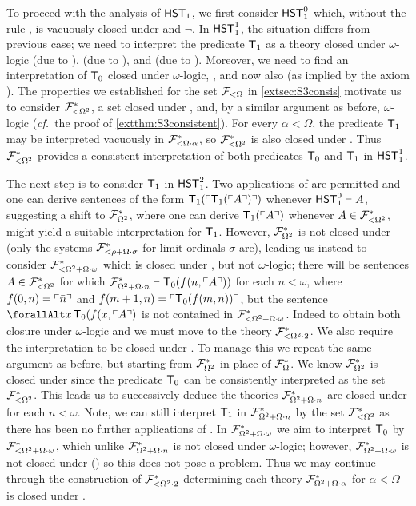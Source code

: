 \documentclass[UKenglish,cleveref,DIV=12]{scrartcl}
\let\forall\forallAlt
\theoremstyle{definition}
\theoremstyle{definition}
\begin{document}
To proceed with the analysis of $\mathsf{HST}_1$, we first consider $\mathsf{HST}_1^0$ which, without
the rule , is vacuously closed
under  and $\lnot$. In $\mathsf{HST}_1^1$, the situation differs
from previous case; we need to interpret the predicate $\mathsf{T}_1$ as a theory closed
under $\omega$-logic (due to ),  (due to ),
 and  (due to ). Moreover, we need to find an interpretation of $\mathsf{T}_0$ closed under $\omega$-logic, , and now also  (as
implied by the axiom ). The properties we established for the set
$\mathcal{F}_{<\Omega}$
in \cref{extsec:S3consis} motivate us to consider $\mathcal{F}^*_{<\Omega^2}$, a set
closed under ,  and, by a
similar argument as before, $\omega$-logic ({{\em cf.}~the proof of
\cref{extthm:S3consistent}}). For every $\alpha<\Omega$, the predicate
$\mathsf{T}_1$ may be interpreted vacuously in $\mathcal{F}^*_{<\Omega\cdot\alpha}$, so
$\mathcal{F}^*_{<\Omega^2}$ is also closed under . Thus $\mathcal{F}^*_{<\Omega^2}$
provides a consistent interpretation of both predicates $\mathsf{T}_0$ and $\mathsf{T}_1$ in
$\mathsf{HST}_1^1$.

The next step is to consider $\mathsf{T}_1$ in $\mathsf{HST}_1^2$. Two applications of
 are permitted and one can derive sentences of the form $\mathsf{T}_1(\ulcorner{\mathsf{T}_1(\ulcorner{A}\urcorner)}\urcorner)$
whenever $\mathsf{HST}_1^0\vdash A$,  suggesting a
shift to $\mathcal{F}^*_{\Omega^2}$, where one can derive $\mathsf{T}_1(\ulcorner{A}\urcorner)$ whenever
$A\in\mathcal{F}^*_{<\Omega^2}$, might yield a suitable interpretation for $\mathsf{T}_1$. However,
$\mathcal{F}^*_{\Omega^2}$ is not closed under  (only the systems
$\mathcal{F}^*_{<\rho+\Omega\cdot \sigma}$ for limit ordinals $\sigma$ are), leading us instead to consider
$\mathcal{F}^*_{<\Omega^2+\Omega\cdot\omega}$ which is closed under , but not
$\omega$-logic; there will be sentences $A\in\mathcal{F}^*_{<\Omega^2}$ for which
$\mathcal{F}^*_{\Omega^2+\Omega\cdot n}\vdash \mathsf{T}_0(f(n,\ulcorner{A}\urcorner))$ for each $n<\omega$, where
$f(0,n)=\ulcorner{\bar n}\urcorner$ and $f(m+1,n)=\ulcorner{\mathsf{T}_0({f(m,n)})}\urcorner$, but the sentence $\forall x\,
\T_0(f(x,\gn A)$ is not contained in $\mathcal{F}^*_{<\Omega^2+\Omega\cdot\omega}$. Indeed to obtain
both closure under $\omega$-logic and  we must move to the theory
$\mathcal{F}^*_{<\Omega^2\cdot2}$. We also require the interpretation to be closed under
. To manage this we repeat the same argument as before, but starting
from $\mathcal{F}^*_{\Omega^2}$ in place of $\mathcal{F}^*_{\Omega}$. We know $\mathcal{F}^*_{\Omega^2}$ is closed
under  since the predicate $\mathsf{T}_0$ can be consistently interpreted
as the set $\mathcal{F}^*_{<\Omega^2}$. This leads us to successively deduce the theories
$\mathcal{F}^*_{\Omega^2+\Omega\cdot n}$ are closed under  for each
$n<\omega$. Note, we can still interpret $\mathsf{T}_1$ in $\mathcal{F}^*_{\Omega^2+\Omega\cdot n}$ by the set
$\mathcal{F}^*_{<\Omega^2}$  as there has been no further
applications of . In $\mathcal{F}^*_{\Omega^2+\Omega\cdot \omega}$ we aim to interpret
$\mathsf{T}_0$ by $\mathcal{F}^*_{<\Omega^2+\Omega\cdot \omega}$, which unlike $\mathcal{F}^*_{\Omega^2+\Omega\cdot n}$ is not closed
under $\omega$-logic; however, $\mathcal{F}^*_{\Omega^2+\Omega\cdot \omega}$ is not closed under
() so this does not pose a problem. Thus we
may continue through the construction of $\mathcal{F}^*_{<\Omega^2\cdot2}$ determining
each theory $\mathcal{F}^*_{\Omega^2+\Omega\cdot \alpha}$ for $\alpha<\Omega$ is closed under
.
\end{document}
